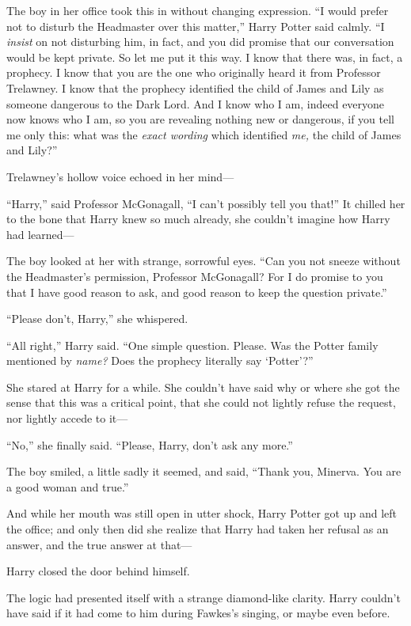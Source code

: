 The boy in her office took this in without changing expression. “I would prefer not to disturb the Headmaster over this matter,” Harry Potter said calmly. “I \emph{insist} on not disturbing him, in fact, and you did promise that our conversation would be kept private. So let me put it this way. I know that there was, in fact, a prophecy. I know that you are the one who originally heard it from Professor Trelawney. I know that the prophecy identified the child of James and Lily as someone dangerous to the Dark Lord. And I know who I am, indeed everyone now knows who I am, so you are revealing nothing new or dangerous, if you tell me only this: what was the \emph{exact wording} which identified \emph{me,} the child of James and Lily?”

Trelawney’s hollow voice echoed in her mind—


“Harry,” said Professor McGonagall, “I can’t possibly tell you that!” It chilled her to the bone that Harry knew so much already, she couldn’t imagine how Harry had learned—

The boy looked at her with strange, sorrowful eyes. “Can you not sneeze without the Headmaster’s permission, Professor McGonagall? For I do promise to you that I have good reason to ask, and good reason to keep the question private.”

“Please don’t, Harry,” she whispered.

“All right,” Harry said. “One simple question. Please. Was the Potter family mentioned by \emph{name?} Does the prophecy literally say ‘Potter’?”

She stared at Harry for a while. She couldn’t have said why or where she got the sense that this was a critical point, that she could not lightly refuse the request, nor lightly accede to it—

“No,” she finally said. “Please, Harry, don’t ask any more.”

The boy smiled, a little sadly it seemed, and said, “Thank you, Minerva. You are a good woman and true.”

And while her mouth was still open in utter shock, Harry Potter got up and left the office; and only then did she realize that Harry had taken her refusal as an answer, and the true answer at that—

Harry closed the door behind himself.

The logic had presented itself with a strange diamond-like clarity. Harry couldn’t have said if it had come to him during Fawkes’s singing, or maybe even before.

